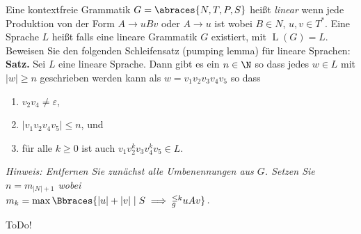 
\begin{exercise}

Eine kontextfreie Grammatik $G = \abraces{N, T, P, S}$ heißt \textit{linear} wenn jede Produktion von der Form $A \to u B v$ oder $A \to u$ ist wobei $B \in N$, $u, v \in T^\ast$.
Eine Sprache $L$ heißt  falls eine lineare Grammatik $G$ existiert, mit $\operatorname L(G) = L$.
Beweisen Sie den folgenden Schleifensatz (pumping lemma) für lineare Sprachen: \\

\textbf{Satz.}
Sei $L$ eine lineare Sprache.
Dann gibt es ein $n \in \N$ so dass jedes $w \in L$ mit $|w| \geq n$ geschrieben werden kann als $w = v_1 v_2 v_3 v_4 v_5$ so dass

\begin{enumerate}
    \item $v_2 v_4 \neq \varepsilon$,
    \item $|v_1 v_2 v_4 v_5| \leq n$, und
    \item für alle $k \geq 0$ ist auch $v_1 v_2^k v_3 v_4^k v_5 \in L$.
\end{enumerate}

\textit{Hinweis: Entfernen Sie zunächst alle Umbenennungen aus $G$. Setzen Sie $n = m_{|N| + 1}$ wobei \\ $m_k = \max \Bbraces{|u| + |v| \mid S \implies_g^{\leq k} u A v}$.}

\end{exercise}


\begin{solution}

ToDo!

\end{solution}

